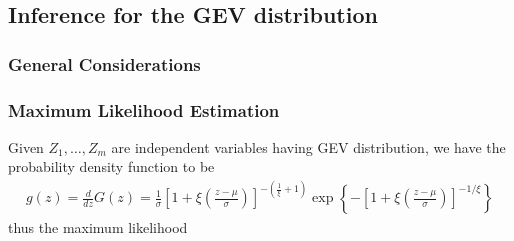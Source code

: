 \documentclass[a4paper,10pt]{article}
\theoremstyle{definition}
\numberwithin{equation}{section}
\begin{document}
\subsection{Inference for the GEV distribution}
\subsubsection{General Considerations}



\subsubsection{Maximum Likelihood Estimation}
Given $Z_1, \ldots, Z_m$ are independent variables having GEV distribution, we have the probability density function to be 
\begin{align*}
g(z)=\frac{d}{dz}G(z) =\frac{1}{\sigma}\left[1+\xi\left(\frac{z-\mu}{\sigma}\right)\right]^{-\left(\frac{1}{\xi}+1\right)}  \exp \left\{-\left[1+\xi\left(\frac{z-\mu}{\sigma}\right)\right]^{-1/\xi}\right\}
\end{align*}
thus the maximum likelihood
%
\end{document}
